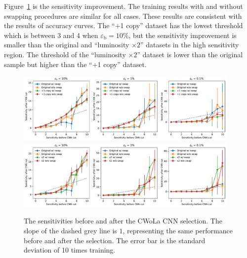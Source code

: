 \documentclass[12pt]{article}
\begin{document}
		Figure~\ref{fig:sensitivity_improvement_bkg_eff_no_swap} is the sensitivity improvement. The training results with and without swapping procedures are similar for all cases. These results are consistent with the results of accuracy curves. The ``+1 copy'' dataset has the lowest threshold which is between 3 and 4 when $\varepsilon_{\text{b}} = 10\%$, but the sensitivity improvement is smaller than the original and ``luminosity $\times 2$'' datasets in the high sensitivity region. The threshold of the ``luminosity $\times 2$'' dataset is lower than the original sample but higher than the ``+1 copy'' dataset.
		\begin{figure}[htpb]
			\centering
			\includegraphics[width=0.97\textwidth]{HVmodel_sensitivity_improvement_bkg_eff_copy_1_no_swap.pdf}
			\includegraphics[width=0.97\textwidth]{HVmodel_sensitivity_improvement_bkg_eff_x2_no_swap.pdf}
			\caption{The sensitivities before and after the CWoLa CNN selection. The slope of the dashed grey line is $1$, representing the same performance before and after the selection. The error bar is the standard deviation of 10 times training.}
			\label{fig:sensitivity_improvement_bkg_eff_no_swap}
		\end{figure}



		
\end{document}
